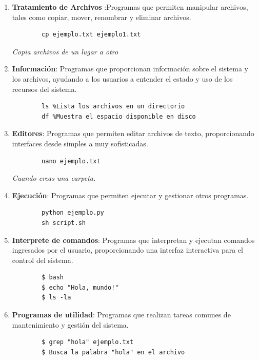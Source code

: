 	\begin{tcolorbox}
	\begin{enumerate}
	\item\textbf{Tratamiento de Archivos }:Programas que permiten manipular archivos, tales como copiar, mover, renombrar y eliminar archivos.

	\begin{lstlisting}
		cp ejemplo.txt ejemplo1.txt
	\end{lstlisting}
	 \textit{Copia archivos de un lugar a otro}
	 
	 \item \textbf{Información}: Programas que proporcionan información sobre el sistema y los archivos, ayudando a los usuarios a entender el estado y uso de los recursos del sistema. 

		\begin{lstlisting}
		ls %Lista los archivos en un directorio
		df %Muestra el espacio disponible en disco
	\end{lstlisting}
	

	
	\item \textbf{Editores}:  Programas que permiten editar archivos de texto, proporcionando interfaces desde simples a muy sofisticadas. 

	\begin{lstlisting}
		nano ejemplo.txt
	\end{lstlisting}
	\textit{Cuando creas una carpeta.}
	
	\item \textbf{Ejecución}: Programas que permiten ejecutar y gestionar otros programas.
		\begin{lstlisting}
		python ejemplo.py
		sh script.sh
	\end{lstlisting}
	
		\item \textbf{Interprete de comandos}: Programas que interpretan y ejecutan comandos ingresados por el usuario, proporcionando una interfaz interactiva para el control del sistema.
	\begin{lstlisting}
		$ bash
		$ echo "Hola, mundo!"
		$ ls -la
	\end{lstlisting}
	
		\item \textbf{Programas de utilidad}: Programas que realizan tareas comunes de mantenimiento y gestión del sistema.
	\begin{lstlisting}
		$ grep "hola" ejemplo.txt
		$ Busca la palabra "hola" en el archivo
		
	\end{lstlisting}
\end{enumerate}
	

\end{tcolorbox}


